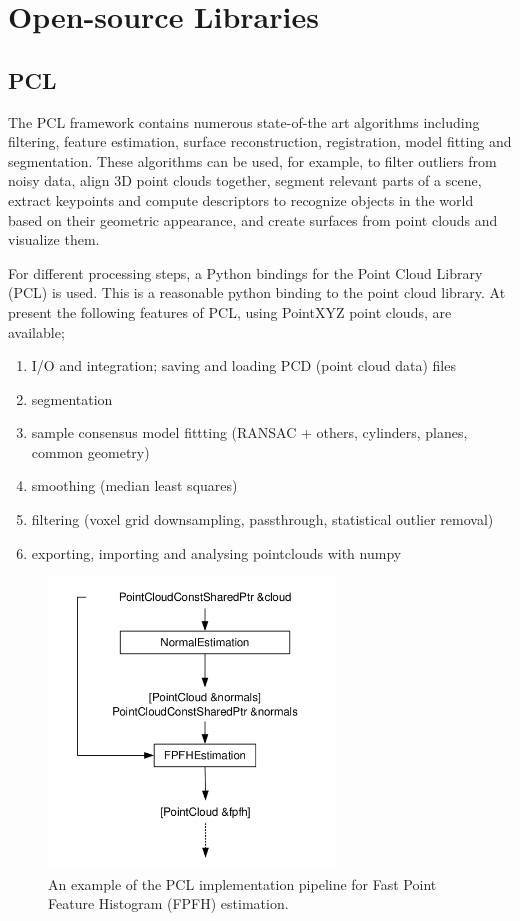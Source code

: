 \section{Open-source Libraries}
\subsection{PCL}

The PCL\cite{pcl} framework contains numerous state-of-the art algorithms including filtering, feature estimation, surface reconstruction, registration, model fitting and segmentation. These algorithms can be used, for example, to filter outliers from noisy data, align 3D point clouds together, segment relevant parts of a scene, extract keypoints and compute descriptors to recognize objects in the world based on their geometric appearance, and create surfaces from point clouds and visualize them. 

For different processing steps, a Python bindings for the Point Cloud Library (PCL) is used. This is a reasonable python binding to the point cloud library. At present the following features of PCL, using PointXYZ point clouds, are available;

\begin{enumerate}
    \item I/O and integration; saving and loading PCD (point cloud data) files
    \item segmentation
    \item sample consensus model fittting (RANSAC + others, cylinders, planes, common geometry)
    \item smoothing (median least squares)
    \item filtering (voxel grid downsampling, passthrough, statistical outlier removal)
    \item exporting, importing and analysing pointclouds with numpy
\end{enumerate}

\begin{figure}[!h]
\begin{center}
\includegraphics[width=3in]{figures02/pcl1.png}
\caption{An  example  of  the  PCL  implementation  pipeline  for  Fast  Point Feature Histogram (FPFH) \cite{fpfh} estimation.}
\end{center}
\end{figure}


